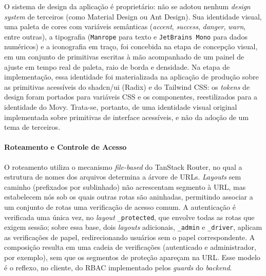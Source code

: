 O sistema de design da aplicação é proprietário: não se adotou nenhum \textit{design system} de terceiros (como Material Design ou Ant Design). Sua identidade visual, uma paleta de cores com variáveis semânticas (\textit{accent}, \textit{success}, \textit{danger}, \textit{warn}, entre outras), a tipografia (\texttt{Manrope} para texto e \texttt{JetBrains Mono} para dados numéricos) e a iconografia em traço, foi concebida na etapa de concepção visual, em um conjunto de primitivas escritas à mão acompanhado de um painel de ajuste em tempo real de paleta, raio de borda e densidade. Na etapa de implementação, essa identidade foi materializada na aplicação de produção sobre as primitivas acessíveis do shadcn/ui (Radix) e do Tailwind CSS: os \textit{tokens} de design foram portados para variáveis CSS e os componentes, reestilizados para a identidade do Movy. Trata-se, portanto, de uma identidade visual original implementada sobre primitivas de interface acessíveis, e não da adoção de um tema de terceiros.

\paragraph{Roteamento e Controle de Acesso}

O roteamento utiliza o mecanismo \textit{file-based} do TanStack Router, no qual a estrutura de nomes dos arquivos determina a árvore de URLs. \textit{Layouts} sem caminho (prefixados por sublinhado) não acrescentam segmento à URL, mas estabelecem nós sob os quais outras rotas são aninhadas, permitindo associar a um conjunto de rotas uma verificação de acesso comum. A autenticação é verificada uma única vez, no \textit{layout} \texttt{\_protected}, que envolve todas as rotas que exigem sessão; sobre essa base, dois \textit{layouts} adicionais, \texttt{\_admin} e \texttt{\_driver}, aplicam as verificações de papel, redirecionando usuários sem o papel correspondente. A composição resulta em uma cadeia de verificações (autenticado e administrador, por exemplo), sem que os segmentos de proteção apareçam na URL. Esse modelo é o reflexo, no cliente, do RBAC implementado pelos \textit{guards} do \textit{backend}.

